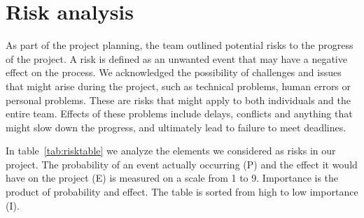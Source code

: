 \newpage
\section{Risk analysis}

\label{sec:risk}
As part of the project planning, the team outlined potential risks to the progress of the project. A risk is defined as an unwanted event that may have a negative effect on the process. We acknowledged the possibility of challenges and issues that might arise during the project, such as technical problems, human errors or personal problems. These are risks that might apply to both individuals and the entire team. Effects of these problems include delays, conflicts and anything that might slow down the progress, and ultimately lead to failure to meet deadlines. 

In table~\ref{tab:risktable} we analyze the elements we considered as risks in our project. The probability of an event actually occurring (P) and the effect it would have on the project (E) is measured on a scale from 1 to 9. Importance is the product of probability and effect. The table is sorted from high to low importance (I). 

